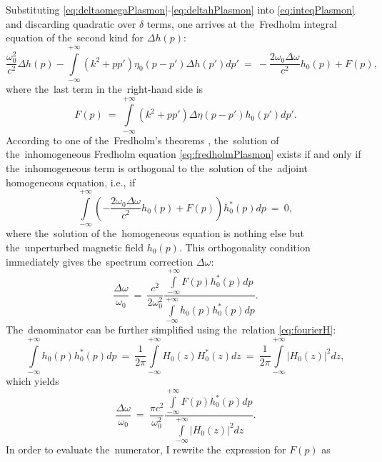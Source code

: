 Substituting \cref{eq:deltaomegaPlasmon}-\cref{eq:deltahPlasmon} into \cref{eq:inteqPlasmon} and discarding quadratic over $\delta$ terms, one arrives at the~Fredholm integral equation of the~second kind for $\Delta h(p)$:
\begin{equation}
\label{eq:fredholmPlasmon}
\frac{\omega_0^2}{c^2}\Delta h\left(p\right)-\int\limits_{-\infty}^{+\infty}\left(k^2+pp'\right)\eta_0 (p-p') \Delta h(p') dp'~=~-\frac{2\omega_0\Delta \omega}{c^2}h_0\left(p\right)+F(p),
\end{equation}
where the~last term in the~right-hand side is
\begin{equation}
\label{eq:FpPlasmon}
F(p)~=~\int\limits_{-\infty}^{+\infty}\left(k^2+pp'\right)\Delta\eta (p-p') h_0(p') dp'.
\end{equation}
According to one of the~Fredholm's theorems \cite{fredholm}, the~solution of the~inhomogeneous Fredholm equation \cref{eq:fredholmPlasmon} exists if and only if the~inhomogeneous term is orthogonal to the~solution of the~adjoint homogeneous equation, i.e., if
\begin{equation}
\label{eq:fredholmtheoremPlasmon}
\int\limits_{-\infty}^{+\infty} \left(-\frac{2\omega_0\Delta \omega}{c^2}h_0\left(p\right)+F(p)\right) h_0^{*}(p) dp~=~0,
\end{equation}
where the~solution of the~homogeneous equation is nothing else but the~unperturbed magnetic field $h_0(p)$.
This orthogonality condition immediately gives the~spectrum correction $\Delta \omega$:
\begin{equation}
\label{eq:correctionPlasmon}
\dfrac{\Delta\omega}{\omega_0}~=~\frac{c^2}{2\omega_0^2}\frac{\int\limits_{-\infty}^{+\infty}F(p)h_0^{*}(p)dp}{\int\limits_{-\infty}^{+\infty}h_0(p)h_0^{*}(p)dp}.
\end{equation}
The~denominator can be further simplified using the~relation \cref{eq:fourierH}:
\begin{equation}
\int\limits_{-\infty}^{+\infty}h_0(p)h_0^{*}(p)dp~=~\frac{1}{2\pi}\int\limits_{-\infty}^{+\infty}H_0(z)H_0^{*}(z)dz~=~\frac{1}{2\pi}\int\limits_{-\infty}^{+\infty}\left|H_0(z)\right|^2 dz,
\end{equation}
which yields
\begin{equation}
\label{eq:correctionPlasmon2}
\dfrac{\Delta\omega}{\omega_0}~=~\frac{\pi c^2}{\omega_0^2}\frac{\int\limits_{-\infty}^{+\infty}F(p)h_0^{*}(p)dp}{\int\limits_{-\infty}^{+\infty}\left|H_0(z)\right|^2 dz}.
\end{equation}
In order to evaluate the~numerator, I rewrite the~expression for $F(p)$ as
